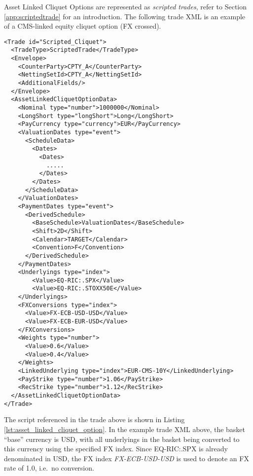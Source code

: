 Asset Linked Cliquet Options are represented as {\em scripted trades}, refer to Section 
\ref{app:scriptedtrade} for an introduction. The following trade XML is an example of
a CMS-linked equity cliquet option (FX crossed).
 
\begin{verbatim} 
<Trade id="Scripted_Cliquet">
  <TradeType>ScriptedTrade</TradeType>
  <Envelope>
    <CounterParty>CPTY_A</CounterParty>
    <NettingSetId>CPTY_A</NettingSetId>
    <AdditionalFields/>
  </Envelope>
  <AssetLinkedCliquetOptionData>
    <Nominal type="number">1000000</Nominal>
    <LongShort type="longShort">Long</LongShort>
    <PayCurrency type="currency">EUR</PayCurrency>
    <ValuationDates type="event">
      <ScheduleData>
        <Dates>
          <Dates>
            .....
          </Dates>
        </Dates>
      </ScheduleData>
    </ValuationDates>
    <PaymentDates type="event">
      <DerivedSchedule>
        <BaseSchedule>ValuationDates</BaseSchedule>
        <Shift>2D</Shift>
        <Calendar>TARGET</Calendar>
        <Convention>F</Convention>
      </DerivedSchedule>
    </PaymentDates>
    <Underlyings type="index">
        <Value>EQ-RIC:.SPX</Value>
        <Value>EQ-RIC:.STOXX50E</Value>
    </Underlyings>
    <FXConversions type="index">
      <Value>FX-ECB-USD-USD</Value>
      <Value>FX-ECB-EUR-USD</Value>
    </FXConversions>
    <Weights type="number">
      <Value>0.6</Value>
      <Value>0.4</Value>
    </Weights>
    <LinkedUnderlying type="index">EUR-CMS-10Y</LinkedUnderlying>
    <PayStrike type="number">1.06</PayStrike>
    <RecStrike type="number">1.12</RecStrike>
  </AssetLinkedCliquetOptionData>
</Trade>
\end{verbatim} 
 
The script referenced in the trade above is shown in Listing
\ref{lst:asset_linked_cliquet_option}. In the example trade XML above, the basket ``base''
currency is USD, with all underlyings in the basket being converted to this currency
using the specified FX index. Since EQ-RIC:.SPX is already denominated in USD, the FX index \emph{FX-ECB-USD-USD} is used to denote an FX rate of 1.0, i.e.\ no conversion.
 
